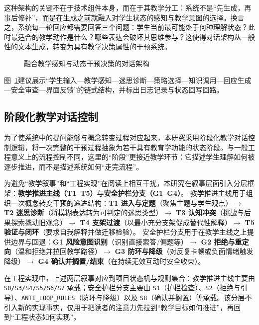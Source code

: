 这种架构的关键不在于技术组件本身，而在于其教学分工：系统不是“先生成，再事后修补”，而是在生成之前就融入对学生状态的感知与教学意图的选择。换言之，系统每一轮回应都需要回答三个问题：学生当前最可能处于何种理解状态？此时最适合的教学动作是什么？哪些表达会破坏其思维参与？这使得对话架构从一般性的文本生成，转变为具有教学决策属性的干预系统。

\begin{figure}[htbp]
    \centering
    \caption{融合教学感知与动态干预决策的对话架构}
    \label{fig:teaching-architecture}
\end{figure}

图~\ref{fig:teaching-architecture}建议展示“学生输入—教学感知—迷思诊断—策略选择—知识调用—回应生成—安全审查—界面反馈”的链式结构，并标出日志记录与状态回写回路。

\subsection{阶段化教学对话控制}
\label{sec:4.3.2}

为了使系统中的提问能够与概念转变过程对应起来，本研究采用阶段化教学对话控制逻辑，将一次完整的干预过程抽象为若干具有教育学功能的状态阶段。与一般工程意义上的流程控制不同，这里的“阶段”更接近教学环节：它描述学生理解如何被逐步推进，而不是描述系统如何“走完流程”。

为避免“教学叙事”和“工程实现”在阅读上相互干扰，本研究在叙事层面引入分层框架：\textbf{教学推进主线（T1--T5）}与\textbf{安全护栏分支（G1--G4）}。
教学推进主线用于组织一次概念转变干预的递进结构：\textbf{T1 进入与定题}（聚焦主题与学生观点）$\rightarrow$ \textbf{T2 迷思诊断}（将模糊表达转为可判定的迷思类型）$\rightarrow$ \textbf{T3 认知冲突}（挑战与后果探索撬动旧观念）$\rightarrow$ \textbf{T4 支架过渡}（以最小充分支架促成替代性解释）$\rightarrow$ \textbf{T5 验证与闭环}（要求自我解释并做迁移检验）。
安全护栏分支用于在教学主线之上提供边界与回退：\textbf{G1 风险意图识别}（识别直接索答/偏题等）$\rightarrow$ \textbf{G2 拒绝与重定向}（温和拒绝并拉回教学路径）$\rightarrow$ \textbf{G3 防环与降级}（对反复卡顿或负面情绪触发降级）$\rightarrow$ \textbf{G4 确认并搁置/结束}（在持续无效互动时安全收束）。

在工程实现中，上述两层叙事对应到项目状态机与规则集合：教学推进主线主要由 \texttt{S0/S3/S4/S5/S6/S7} 承载；安全护栏分支主要由 \texttt{S1}（护栏检查）、\texttt{S2}（拒绝与引导）、\texttt{ANTI\_LOOP\_RULES}（防环与降级）以及 \texttt{S8}（确认并搁置）等承载。该分层不引入新的实现事实，仅用于把读者的注意力先拉到“教学目标如何推进”，再回到“工程状态如何实现”。

